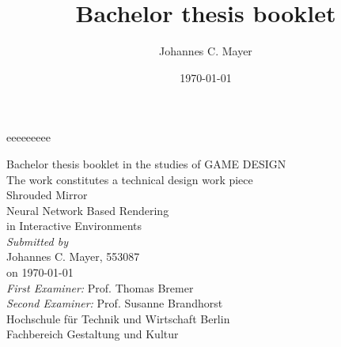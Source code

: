 \documentclass[a4paper, twoside, 10pt]{report}
\title{Bachelor thesis booklet}
\author{Johannes C. Mayer}
\date{\today}
\newcommand\blankpage{\null\thispagestyle{empty}\addtocounter{page}{0}\newpage}
\begin{document}
\begin{titlepage}
\end{titlepage}


\blankpage
eeeeeeeee

\begin{flushleft}
\begin{spacing}{1.5}
{\large
Bachelor thesis booklet in the studies of GAME DESIGN \\
The work constitutes a technical design work piece \\
\vspace*{\fill}
{\Huge Shrouded Mirror} \\
{\Large Neural Network Based Rendering \\ in Interactive Environments \\}
\vspace*{\fill}
\textit{Submitted by} \\
Johannes C. Mayer, 553087 \\
on \today \\
\vspace*{1cm}
\textit{First Examiner:} Prof. Thomas Bremer \\
\textit{Second Examiner:} Prof. Susanne Brandhorst \\
\vspace*{1cm}
Hochschule f\"ur Technik und Wirtschaft Berlin \\
Fachbereich Gestaltung und Kultur \\
}
\end{spacing}
\end{flushleft}



\tableofcontents
\clearpage

\end{document}
